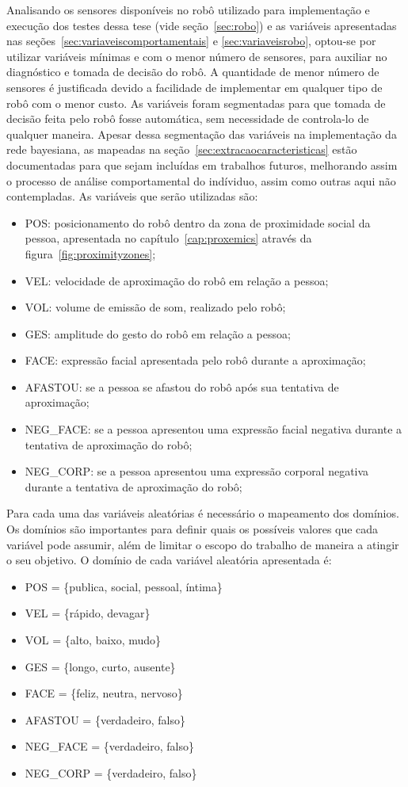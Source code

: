 Analisando os sensores disponíveis no robô utilizado para implementação e execução dos testes dessa tese (vide seção~\ref{sec:robo}) e as variáveis apresentadas nas seções~\ref{sec:variaveiscomportamentais} e \ref{sec:variaveisrobo}, optou-se por utilizar variáveis mínimas e com o menor número de sensores, para auxiliar no diagnóstico e tomada de decisão do robô. A quantidade de menor número de sensores é justificada devido a facilidade de implementar em qualquer tipo de robô com o menor custo. As variáveis foram segmentadas para que tomada de decisão feita pelo robô fosse automática, sem necessidade de controla-lo de qualquer maneira. Apesar dessa segmentação das variáveis na implementação da rede bayesiana, as mapeadas na seção~\ref{sec:extracaocaracteristicas} estão documentadas para que sejam incluídas em trabalhos futuros, melhorando assim o processo de análise comportamental do indíviduo, assim como outras aqui não contempladas. As variáveis que serão utilizadas são:

\begin{itemize}
	\item POS: posicionamento do robô dentro da zona de proximidade social da pessoa, apresentada no capítulo~\ref{cap:proxemics} através da figura~\ref{fig:proximityzones};
	\item VEL: velocidade de aproximação do robô em relação a pessoa;
	\item VOL: volume de emissão de som, realizado pelo robô;
	\item GES: amplitude do gesto do robô em relação a pessoa;
	\item FACE: expressão facial apresentada pelo robô durante a aproximação;
	\item AFASTOU: se a pessoa se afastou do robô após sua tentativa de aproximação;
	\item NEG\_FACE: se a pessoa apresentou uma expressão facial negativa durante a tentativa de aproximação do robô;
	\item NEG\_CORP: se a pessoa apresentou uma expressão corporal negativa durante a tentativa de aproximação do robô;
\end{itemize}

Para cada uma das variáveis aleatórias é necessário o mapeamento dos domínios. Os domínios são importantes para definir quais os possíveis valores que cada variável pode assumir, além de limitar o escopo do trabalho de maneira a atingir o seu objetivo. O domínio de cada variável aleatória apresentada é:

\begin{itemize}
	\item POS = \{publica, social, pessoal, íntima\}
	\item VEL = \{rápido, devagar\}
	\item VOL = \{alto, baixo, mudo\}
	\item GES = \{longo, curto, ausente\}
	\item FACE = \{feliz, neutra, nervoso\}
	\item AFASTOU = \{verdadeiro, falso\}
	\item NEG\_FACE = \{verdadeiro, falso\}
	\item NEG\_CORP = \{verdadeiro, falso\}
\end{itemize}

